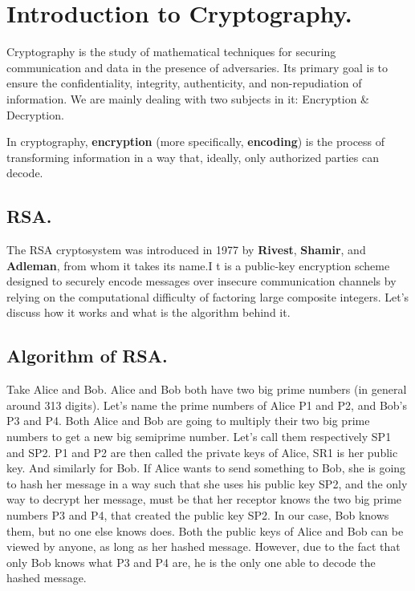 \section{Introduction to Cryptography.}
Cryptography is the study of mathematical techniques for securing communication and data in the presence of adversaries. Its primary goal is to ensure the confidentiality, integrity, authenticity, and non-repudiation of information. We are mainly dealing with two subjects in it: Encryption \& Decryption.

\begin{definitionbox}
In cryptography, \textbf{encryption} (more specifically, \textbf{encoding}) is the process of transforming information in a way that, ideally, only authorized parties can decode.
\end{definitionbox}

\subsection{RSA.}

The RSA cryptosystem was introduced in 1977 by \textbf{Rivest},\textbf{ Shamir}, and \textbf{Adleman}, from whom it takes its name.I t is a public-key encryption scheme designed to securely encode messages over insecure communication channels by relying on the computational difficulty of factoring large composite integers. Let’s discuss how it works and what is the algorithm behind it.
\subsection{Algorithm of RSA.}
Take Alice and Bob. Alice and Bob both have two big prime numbers (in general around 313 digits). Let’s name the prime numbers of Alice P1 and P2, and Bob’s P3 and P4.\nl
Both Alice and Bob are going to multiply their two big prime numbers to get a new big semiprime number. Let’s call them respectively SP1 and SP2.\nl
P1 and P2 are then called the private keys of Alice, SR1 is her public key. And similarly for Bob.\nl
If Alice wants to send something to Bob, she is going to hash her message in a way such that she uses his public key SP2, and the only way to decrypt her message, must be that her receptor knows the two big prime numbers P3 and P4, that created the public key SP2. In our case, Bob knows them, but no one else knows does. Both the public keys of Alice and Bob can be viewed by anyone, as long as her hashed message. However, due to the fact that only Bob knows what P3 and P4 are, he is the only one able to decode the hashed message.


